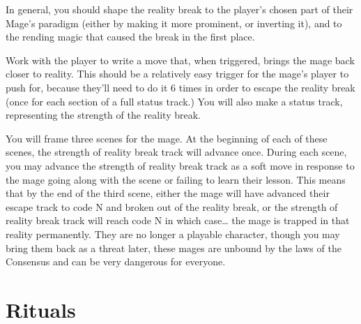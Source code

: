 \documentclass[
  oneside,
  statementpaper,
  9pt]{memoir}
\begin{document}
\begin{MC}

In general, you should shape the reality break to the player's chosen part of their Mage's paradigm (either by making it more prominent, or inverting it), and to the rending magic that caused the break in the first place.

Work with the player to write a move that, when triggered, brings the mage back closer to reality. This should be a relatively easy trigger for the mage’s player to push for, because they’ll need to do it 6 times in order to escape the reality break (once for each section of a full status track.) You will also make a status track, representing the strength of the reality break.

You will frame three scenes for the mage. At the beginning of each of these scenes, the strength of reality break track will advance once. During each scene, you may advance the strength of reality break track as a soft move in response to the mage going along with the scene or failing to learn their lesson. This means that by the end of the third scene, either the mage will have advanced their escape track to code N and broken out of the reality break, or the strength of reality break track will reach code N in which case… the mage is trapped in that reality permanently. They are no longer a playable character, though you may bring them back as a threat later, these mages are unbound by the laws of the Consensus and can be very dangerous for everyone.

\end{MC}

\hypertarget{rituals}{%
\section{Rituals}\label{rituals}}
\end{document}
